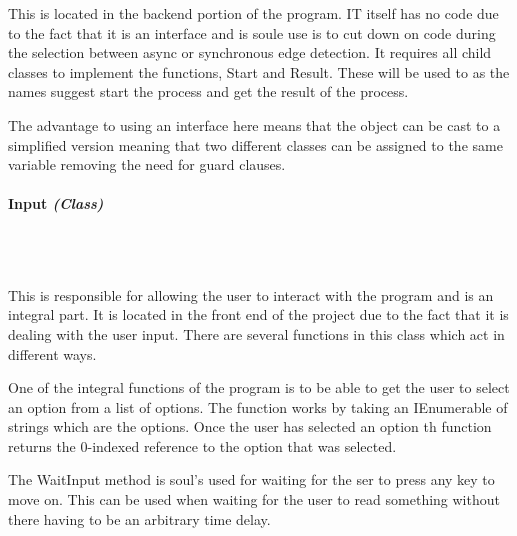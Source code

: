 \begin{FlushLeft}
    This is located in the backend portion of the program. IT itself has no code due to the fact that it is an interface and is soule use is to cut down on code during the selection between async or synchronous edge detection. It requires all child classes to implement the functions, Start and Result. These will be used to as the names suggest start the process and get the result of the process. \\ \bk

    The advantage to using an interface here means that the object can be cast to a simplified version meaning that two different classes can be assigned to the same variable removing the need for guard clauses. \\
    \bk

    
    \paragraph{Input \textit{(Class)}} \mbox{} \\

    \begin{figure}[H]
        \centering
    \end{figure}\\

    This is responsible for allowing the user to interact with the program and is an integral part. It is located in the front end of the project due to the fact that it is dealing with the user input. There are several functions in this class which act in different ways. \\ \bk

    One of the integral functions of the program is to be able to get the user to select an option from a list of options. The function works by taking an IEnumerable of strings which are the options. Once the user has selected an option th function returns the 0-indexed reference to the option that was selected. \\ \bk

    The WaitInput method is soul's used for waiting for the ser to press any key to move on. This can be used when waiting for the user to read something without there having to be an arbitrary time delay. \\ \bk


\end{FlushLeft}
